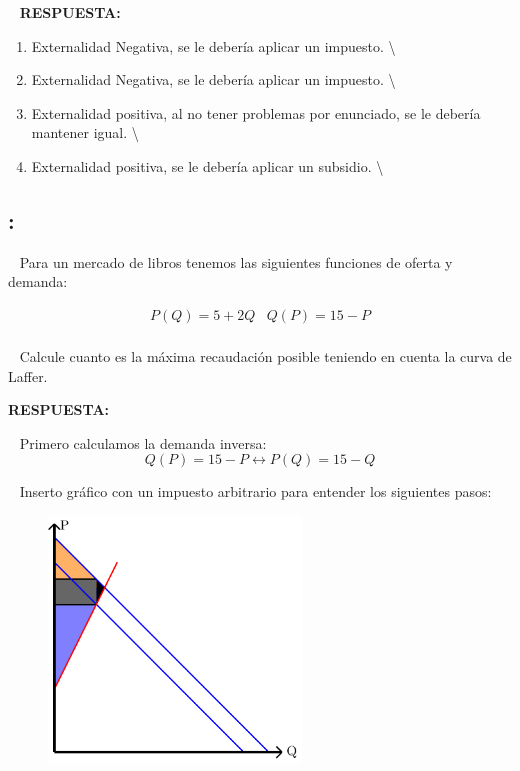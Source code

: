 \documentclass[
  letterpaper,
  DIV=11,
  numbers=noendperiod]{scrreport}
\providecommand{\tightlist}{%
  \setlength{\itemsep}{0pt}\setlength{\parskip}{0pt}}\usepackage{longtable,booktabs,array}
\begin{document}
~ \textbf{RESPUESTA:}

\begin{enumerate}
\def\labelenumi{\arabic{enumi})}
\tightlist
\item
  Externalidad Negativa, se le debería aplicar un impuesto.
  \textbackslash{}
\item
  Externalidad Negativa, se le debería aplicar un impuesto.
  \textbackslash{}
\item
  Externalidad positiva, al no tener problemas por enunciado, se le
  debería mantener igual. \textbackslash{}
\item
  Externalidad positiva, se le debería aplicar un subsidio.
  \textbackslash{}
\end{enumerate}

\hypertarget{section-35}{%
\subsection{:}\label{section-35}}

~ Para un mercado de libros tenemos las siguientes funciones de oferta y
demanda:

\[
\begin{array}{cc} P(Q)=5+2Q & Q(P)=15-P\\\end{array}
\]

~ Calcule cuanto es la máxima recaudación posible teniendo en cuenta la
curva de Laffer.

\textbf{RESPUESTA:}

~ Primero calculamos la demanda inversa: \[
Q(P)=15-P \longleftrightarrow P(Q)=15-Q
\]

~ Inserto gráfico con un impuesto arbitrario para entender los
siguientes pasos:

\begin{figure}

{\centering \includegraphics[width=0.6\textwidth,height=\textheight]{8ej_pauta_files/figure-pdf/unnamed-chunk-15-1.pdf}

}

\end{figure}
\end{document}
